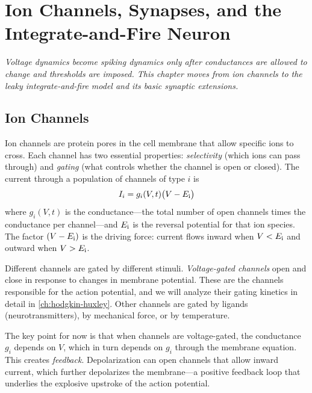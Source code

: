 \chapter{Ion Channels, Synapses, and the Integrate-and-Fire Neuron}
\label{ch:lif}

\textit{Voltage dynamics become spiking dynamics only after conductances are allowed to change and thresholds are imposed. This chapter moves from ion channels to the leaky integrate-and-fire model and its basic synaptic extensions.}

\section{Ion Channels}
\label{sec:ion-channels}

Ion channels are protein pores in the cell membrane that allow specific ions to cross. Each channel has two essential properties: \emph{selectivity} (which ions can pass through) and \emph{gating} (what controls whether the channel is open or closed). The current through a population of channels of type $i$ is
%
\begin{equation}
  I_i = g_i(V, t)\bigl(V - E_{\mathrm{i}}\bigr)
  \label{eq:channel-current}
\end{equation}
%
where $g_i(V, t)$ is the conductance---the total number of open channels times the conductance per channel---and $E_{\mathrm{i}}$ is the reversal potential for that ion species. The factor $(V - E_{\mathrm{i}})$ is the driving force: current flows inward when $V < E_{\mathrm{i}}$ and outward when $V > E_{\mathrm{i}}$.

Different channels are gated by different stimuli. \emph{Voltage-gated channels} open and close in response to changes in membrane potential. These are the channels responsible for the action potential, and we will analyze their gating kinetics in detail in \cref{ch:hodgkin-huxley}. Other channels are gated by ligands (neurotransmitters), by mechanical force, or by temperature.

The key point for now is that when channels are voltage-gated, the conductance $g_i$ depends on $V$, which in turn depends on $g_i$ through the membrane equation. This creates \emph{feedback}. Depolarization can open channels that allow inward current, which further depolarizes the membrane---a positive feedback loop that underlies the explosive upstroke of the action potential.

